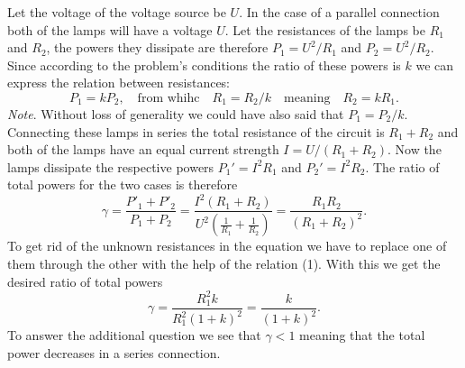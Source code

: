\solueng
Let the voltage of the voltage source be $U$. In the case of a parallel connection both of the lamps will have a voltage $U$. Let the resistances of the lamps be $R_1$ and $R_2$, the powers they dissipate are therefore $P_1=U^2/R_1$ and $P_2=U^2/R_2$. Since according to the problem’s conditions the ratio of these powers is $k$ we can express the relation between resistances:
\begin{equation}
\label{eq:R12suhe}
P_1 = kP_2, \quad \text{from whihc} \quad R_1 = R_2/k \quad \text{meaning} \quad R_2=kR_1.
\end{equation}
\emph{Note}. Without loss of generality we could have also said that $P_1 = P_2/k$.\\
Connecting these lamps in series the total resistance of the circuit is $R_1+R_2$ and both of the lamps have an equal current strength $I=U/(R_1+R_2)$. Now the lamps dissipate the respective powers $P_1'=I^2R_1$ and $P_2'=I^2R_2$.
The ratio of total powers for the two cases is therefore
\[
\gamma = \frac{P'_1+P'_2}{P_1+P_2} = \frac{I^2(R_1+R_2)}{U^2(\frac{1}{R_1}+\frac{1}{R_2})}=
\frac{R_1R_2}{(R_1+R_2)^2}.
\] 
To get rid of the unknown resistances in the equation we have to replace one of them through the other with the help of the relation (1). With this we get the desired ratio of total powers
\[
\gamma = \frac{R_1^2 k}{R_1^2(1+k)^2} = \frac{k}{(1+k)^2}.
\] 
To answer the additional question we see that $\gamma < 1$ meaning that the total power decreases in a series connection.
\probend